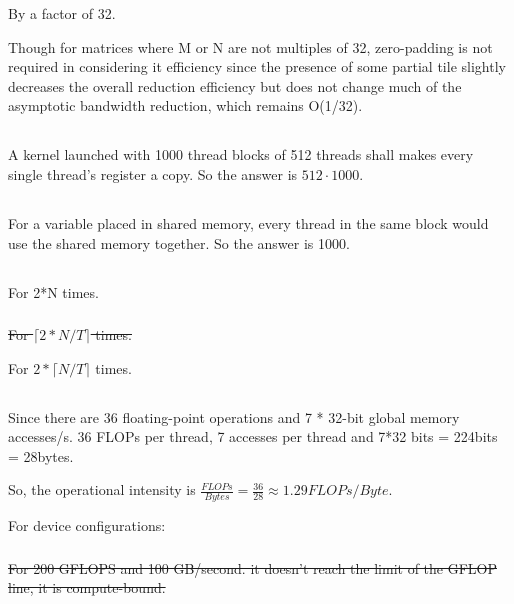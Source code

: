 \documentclass{article}
\begin{document}
By a factor of 32.

Though for matrices where M or N are not multiples of 32, zero-padding is not required in considering it efficiency since the presence of some partial tile slightly decreases the overall reduction efficiency but does not change much of the asymptotic bandwidth reduction, which remains O(1/32).

\subsection{}
A kernel launched with 1000 thread blocks of 512 threads shall makes every single thread's register a copy. So the answer is $512\cdot1000$. 

\subsection{}
For a variable placed in shared memory, every thread in the same block would use the shared memory together. So the answer is 1000.

\subsection{}
\subsubsection{}
For 2*N times.

\subsubsection{}
\sout{For $\lceil 2*N/T \rceil$ times.}

For $2 * \lceil N/T \rceil$ times.

\subsection{}
Since there are 36 floating-point operations and 7 * 32-bit global memory accesses/s. 36 FLOPs per thread, 7 accesses per thread and 7*32 bits = 224bits = 28bytes.

So, the operational intensity is \(\frac{FLOPs}{Bytes} = \frac{36}{28} \approx 1.29 FLOPs/Byte\).

For device configurations:
\subsubsection{}
\sout{For 200 GFLOPS and 100 GB/second. it doesn't reach the limit of the GFLOP line, it is compute-bound.}
\end{document}

